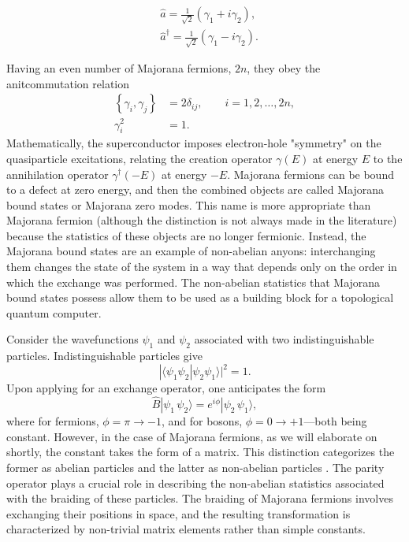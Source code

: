 \documentclass{article}
\begin{document}
$$
	\begin{aligned}
		 & \hat{a}=\frac{1}{\sqrt{2}}\left(\gamma_1+i \gamma_2\right),            \\
		 & \hat{a}^{\dagger}=\frac{1}{\sqrt{2}}\left(\gamma_1-i \gamma_2\right) .
		\label{eq:ferm as mf}
	\end{aligned}
$$

Having an even number of Majorana fermions, $ 2n $, they obey the anitcommutation relation
\begin{equation}
	\begin{aligned}
		\left\{\gamma_i, \gamma_j\right\} & = 2 \delta_{i j}, \qquad i=1, 2, \dots, 2n  , \\
		\gamma_i^2                        & = 1.
	\end{aligned}
\end{equation}
Mathematically, the superconductor imposes electron-hole "symmetry" on the quasiparticle excitations, relating the creation operator $\gamma(E)$ at energy $E$ to the annihilation operator $\gamma^{\dagger}(-E)$ at energy $-E$.\cite{Majorana-returns} Majorana fermions can be bound to a defect at zero energy, and then the combined objects are called Majorana bound states or Majorana zero modes. This name is more appropriate than Majorana fermion (although the distinction is not always made in the literature) because the statistics of these objects are no longer fermionic. Instead, the Majorana bound states are an example of non-abelian anyons: interchanging them changes the state of the system in a way that depends only on the order in which the exchange was performed. The non-abelian statistics that Majorana bound states possess allow them to be used as a building block for a topological quantum computer.

Consider the wavefunctions $ \psi_1 $ and $ \psi_2 $ associated with two indistinguishable particles. Indistinguishable particles give
\[
	| \langle \psi_1 \psi_2 | \psi_2 \psi_1 \rangle |^2 = 1 .
\]
Upon applying for an exchange operator, one anticipates the form
\begin{equation}
	\hat{B} | \psi_1\, \psi_2 \rangle = e^{i\phi} | \psi_2\, \psi_1 \rangle,
\end{equation}
where for fermions, $ \phi = \pi \rightarrow -1 $, and for bosons, $ \phi = 0 \rightarrow +1 $—both being constant. However, in the case of Majorana fermions, as we will elaborate on shortly, the constant takes the form of a matrix. This distinction categorizes the former as abelian particles and the latter as non-abelian particles \cite{Nayak_2008}. The parity operator plays a crucial role in describing the non-abelian statistics associated with the braiding of these particles. The braiding of Majorana fermions involves exchanging their positions in space, and the resulting transformation is characterized by non-trivial matrix elements rather than simple constants.
\end{document}
